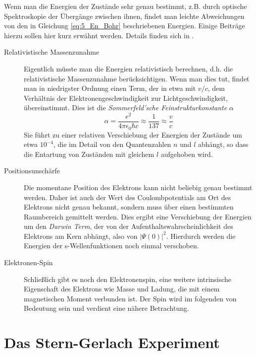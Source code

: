Wenn man die Energien der Zustände sehr genau bestimmt, z.B. durch optische Spektroskopie der Übergänge zwischen ihnen, findet man leichte Abweichungen von den in Gleichung \ref{eq:5_En_Bohr} beschriebenen Energien. Einige Beiträge hierzu sollen hier kurz erwähnt werden. Details finden sich in \cite{Demtröder_ep3}.
\begin{description}
    \item[Relativistische Massenzunahme]  Eigentlich müsste man die Energien relativistisch berechnen, d.h. die relativistische Massenzunahme berücksichtigen. Wenn man dies tut, findet man in niedrigster Ordnung einen Term, der in etwa mit $v/c$, dem Verhältnis der Elektronengeschwindigkeit zur Lichtgeschwindigkeit, übereinstimmt. Dies ist die \emph{Sommerfeld'sche Feinstrukturkonstante} $\alpha$
\begin{equation}
    \alpha = \frac{e^2}{4 \pi \epsilon_0 \hbar c} \approx \frac{1}{137} \approx \frac{v}{c}
\end{equation}
Sie führt zu einer relativen Verschiebung der Energien der Zustände um etwa $10^{-4}$, die im Detail von den Quantenzahlen $n$ und $l$ abhängt, so dass die Entartung von Zuständen mit gleichem $l$ aufgehoben wird. 

    \item[Positionsunschärfe] Die momentane Position des Elektrons kann nicht beliebig genau bestimmt werden. Daher ist auch der Wert des Coulombpotentials am Ort des Elektrons nicht genau bekannt, sondern muss über einen bestimmten Raumbereich gemittelt werden. Dies ergibt eine Verschiebung der Energien um den \emph{Darwin Term}, der von der Aufenthaltswahrscheinlichkeit des Elektrons am Kern abhängt, also von $|\Psi(0)|^2$. Hierdurch werden die Energien der s-Wellenfunktionen noch einmal verschoben.
    
    \item[Elektronen-Spin]  Schließlich gibt es noch den Elektronenspin, eine weitere intrinsische Eigenschaft des Elektrons wie Masse und Ladung, die mit einem magnetischen Moment verbunden ist. Der Spin wird im folgenden von Bedeutung sein und verdient eine nähere Betrachtung.
\end{description}




\section{Das Stern-Gerlach Experiment}

